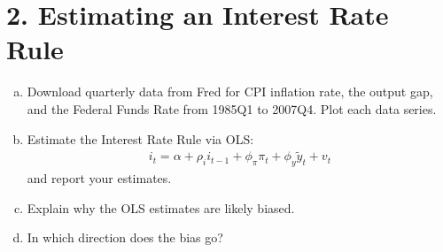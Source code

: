 \documentclass{article}
\newcommand{\1}{\mathbf{1}}
\begin{document}
\section*{2. Estimating an Interest Rate Rule}
\begin{enumerate}[(a)]
	\item Download quarterly data from Fred for CPI inflation rate, the output gap, and the Federal Funds Rate from 1985Q1 to 2007Q4. Plot each data series.
	\item Estimate the Interest Rate Rule via OLS:
	\begin{align*}
		i_{t} = \alpha + \rho_i i_{t-1} + \phi_{\pi}\pi_{t} + \phi_{y}\tilde{y}_t + v_t
	\end{align*}
	and report your estimates.
	\item Explain why the OLS estimates are likely biased. 
	\item In which direction does the bias go?
\end{enumerate}
\end{document}
